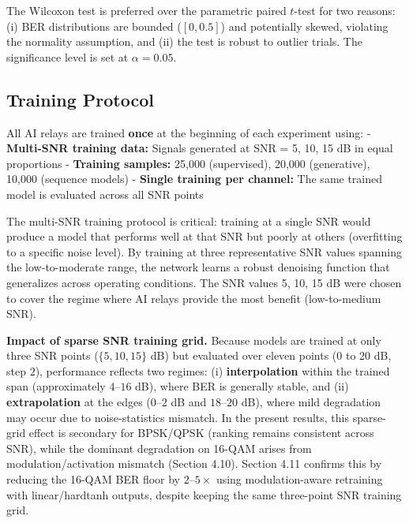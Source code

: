 The Wilcoxon test is preferred over the parametric paired \(t\)-test for two reasons: (i) BER distributions are bounded (\([0, 0.5]\)) and potentially skewed, violating the normality assumption, and (ii) the test is robust to outlier trials. The significance level is set at \(\alpha = 0.05\).

\subsection{Training Protocol}\label{sec:training-protocol}

All AI relays are trained \textbf{once} at the beginning of each experiment using: - \textbf{Multi-SNR training data:} Signals generated at SNR = 5, 10, 15 dB in equal proportions - \textbf{Training samples:} 25,000 (supervised), 20,000 (generative), 10,000 (sequence models) - \textbf{Single training per channel:} The same trained model is evaluated across all SNR points

The multi-SNR training protocol is critical: training at a single SNR would produce a model that performs well at that SNR but poorly at others (overfitting to a specific noise level). By training at three representative SNR values spanning the low-to-moderate range, the network learns a robust denoising function that generalizes across operating conditions. The SNR values 5, 10, 15 dB were chosen to cover the regime where AI relays provide the most benefit (low-to-medium SNR).

\textbf{Impact of sparse SNR training grid.} Because models are trained at only three SNR points (\(\{5,10,15\}\) dB) but evaluated over eleven points (\(0\) to \(20\) dB, step \(2\)), performance reflects two regimes: (i) \textbf{interpolation} within the trained span (approximately \(4\)--\(16\) dB), where BER is generally stable, and (ii) \textbf{extrapolation} at the edges (\(0\)--\(2\) dB and \(18\)--\(20\) dB), where mild degradation may occur due to noise-statistics mismatch. In the present results, this sparse-grid effect is secondary for BPSK/QPSK (ranking remains consistent across SNR), while the dominant degradation on 16-QAM arises from modulation/activation mismatch (Section 4.10). Section 4.11 confirms this by reducing the 16-QAM BER floor by \(2\)--\(5\times\) using modulation-aware retraining with linear/hardtanh outputs, despite keeping the same three-point SNR training grid.

